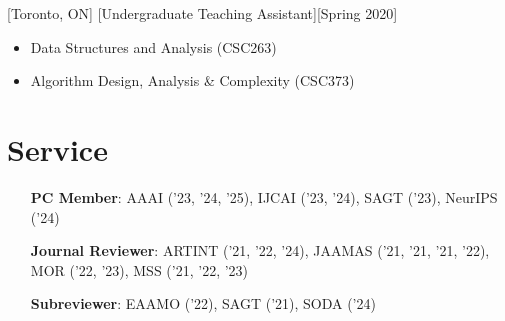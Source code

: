 \documentclass{article}
\begin{document}
    [Toronto, ON]
    [Undergraduate Teaching Assistant][Spring 2020]
    \begin{itemize}
        \item Data Structures and Analysis (CSC263)
        \item Algorithm Design, Analysis \& Complexity (CSC373)
    \end{itemize}
    
    \section{Service}
    \begin{enumerate}[align=left]
    	\item[\textbf{PC Member}:] AAAI ('23, '24, '25), IJCAI ('23, '24), SAGT ('23), NeurIPS ('24)
    	\item[\textbf{Journal Reviewer}:] ARTINT ('21, '22, '24), JAAMAS ('21, '21, '21, '22), MOR ('22, '23), MSS ('21, '22, '23)
    	\item[\textbf{Subreviewer}:] EAAMO ('22), SAGT ('21), SODA ('24)
    \end{enumerate}
    
\end{document}
